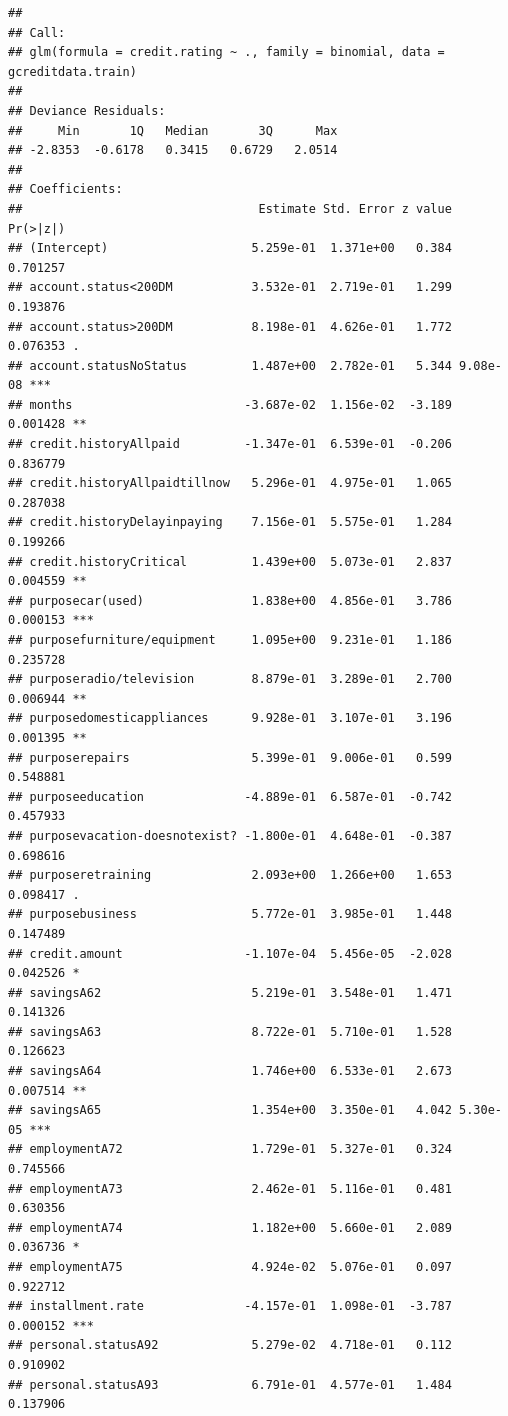 \documentclass[]{book}
\begin{document}
\begin{verbatim}
## 
## Call:
## glm(formula = credit.rating ~ ., family = binomial, data = gcreditdata.train)
## 
## Deviance Residuals: 
##     Min       1Q   Median       3Q      Max  
## -2.8353  -0.6178   0.3415   0.6729   2.0514  
## 
## Coefficients:
##                                 Estimate Std. Error z value Pr(>|z|)    
## (Intercept)                    5.259e-01  1.371e+00   0.384 0.701257    
## account.status<200DM           3.532e-01  2.719e-01   1.299 0.193876    
## account.status>200DM           8.198e-01  4.626e-01   1.772 0.076353 .  
## account.statusNoStatus         1.487e+00  2.782e-01   5.344 9.08e-08 ***
## months                        -3.687e-02  1.156e-02  -3.189 0.001428 ** 
## credit.historyAllpaid         -1.347e-01  6.539e-01  -0.206 0.836779    
## credit.historyAllpaidtillnow   5.296e-01  4.975e-01   1.065 0.287038    
## credit.historyDelayinpaying    7.156e-01  5.575e-01   1.284 0.199266    
## credit.historyCritical         1.439e+00  5.073e-01   2.837 0.004559 ** 
## purposecar(used)               1.838e+00  4.856e-01   3.786 0.000153 ***
## purposefurniture/equipment     1.095e+00  9.231e-01   1.186 0.235728    
## purposeradio/television        8.879e-01  3.289e-01   2.700 0.006944 ** 
## purposedomesticappliances      9.928e-01  3.107e-01   3.196 0.001395 ** 
## purposerepairs                 5.399e-01  9.006e-01   0.599 0.548881    
## purposeeducation              -4.889e-01  6.587e-01  -0.742 0.457933    
## purposevacation-doesnotexist? -1.800e-01  4.648e-01  -0.387 0.698616    
## purposeretraining              2.093e+00  1.266e+00   1.653 0.098417 .  
## purposebusiness                5.772e-01  3.985e-01   1.448 0.147489    
## credit.amount                 -1.107e-04  5.456e-05  -2.028 0.042526 *  
## savingsA62                     5.219e-01  3.548e-01   1.471 0.141326    
## savingsA63                     8.722e-01  5.710e-01   1.528 0.126623    
## savingsA64                     1.746e+00  6.533e-01   2.673 0.007514 ** 
## savingsA65                     1.354e+00  3.350e-01   4.042 5.30e-05 ***
## employmentA72                  1.729e-01  5.327e-01   0.324 0.745566    
## employmentA73                  2.462e-01  5.116e-01   0.481 0.630356    
## employmentA74                  1.182e+00  5.660e-01   2.089 0.036736 *  
## employmentA75                  4.924e-02  5.076e-01   0.097 0.922712    
## installment.rate              -4.157e-01  1.098e-01  -3.787 0.000152 ***
## personal.statusA92             5.279e-02  4.718e-01   0.112 0.910902    
## personal.statusA93             6.791e-01  4.577e-01   1.484 0.137906    

\end{verbatim}
\end{document}
